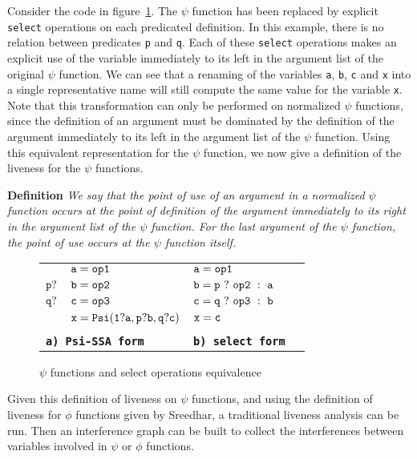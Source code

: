 Consider the code in figure~\ref{fig:psi-select}. The $\psi$ function
has been replaced by explicit {\tt select} operations on each
predicated definition. In this example, there is no relation between
predicates {\tt p} and {\tt q}. Each of these {\tt select} operations
makes an explicit use of the variable immediately to its left in the
argument list of the original $\psi$ function. We can see that a
renaming of the variables {\tt a}, {\tt b}, {\tt c} and {\tt x} into a
single representative name will still compute the same value for the
variable {\tt x}. Note that this transformation can only be performed
on normalized $\psi$ functions, since the definition of an argument
must be dominated by the definition of the argument immediately to its
left in the argument list of the $\psi$ function. Using this
equivalent representation for the $\psi$ function, we now give a
definition of the liveness for the $\psi$ functions.

{\bf Definition} {\em We say that the point of use of an argument in a
normalized $\psi$ function occurs at the point of definition of the
argument immediately to its right in the argument list of the $\psi$
function. For the last argument of the $\psi$ function, the point of
use occurs at the $\psi$ function itself.  }

\begin{figure}
\begin{center}
\footnotesize
\begin{tabular}{llll}
           & ${\tt a = op1}$ & ${\tt a = op1}$ \\
${\tt p?}$ & ${\tt b = op2}$ & ${\tt b = p\ ?\ op2\ :\ a}$ \\
${\tt q?}$ & ${\tt c = op3}$ & ${\tt c = q\ ?\ op3\ :\ b}$ \\
           & ${\tt x = Psi(1?a,p?b,q?c)}$ & ${\tt x = c}$ \\
\\
\multicolumn{2}{l}{\tt {\bf a) Psi-SSA form}} & {\tt {\bf b) select form}}
\end{tabular}
\caption{$\psi$ functions and select operations equivalence}
\label{fig:psi-select}
\end{center}
\end{figure}

Given this definition of liveness on $\psi$ functions, and using the
definition of liveness for $\phi$ functions given by Sreedhar, a
traditional liveness analysis can be run. Then an interference graph
can be built to collect the interferences between variables involved
in $\psi$ or $\phi$ functions.


